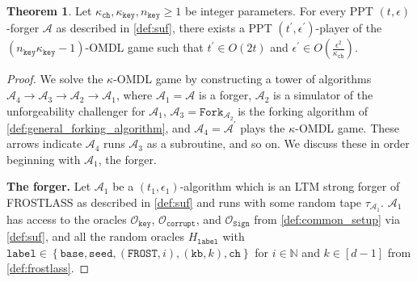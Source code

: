 \documentclass[11pt]{article}
\theoremstyle{definition}
\newtheorem{theorem}{Theorem}[section]
\newcommand{\sign}{\texttt{Sign}}
\newcommand{\corruptionOracle}{\mathcal{O}_{\texttt{corrupt}}}
\newcommand{\signingOracle}{\mathcal{O}_{\sign}}
\newcommand{\keyOracle}{\mathcal{O}_{\texttt{key}}}
\begin{document}
\begin{theorem}\label{thm:suf}
Let $\kappa_{\texttt{ch}}, \kappa_{\texttt{key}}, n_{\texttt{key}} \geq 1$ be integer parameters. For every PPT $(t, \epsilon)$-forger $\mathcal{A}$ as described in \cref{def:suf}, there exists a PPT $(t^\prime, \epsilon^\prime)$-player of the $(n_{\texttt{key}}\kappa_{\texttt{key}} - 1)$-OMDL game such that $t^\prime \in O(2t)$ and $\epsilon^\prime \in O(\frac{\epsilon^2}{\kappa_{\texttt{ch}}})$.
\end{theorem}
\begin{proof}
We solve the $\kappa$-OMDL game by constructing a tower of algorithms $\mathcal{A}_4 \rightarrow \mathcal{A}_3 \rightarrow \mathcal{A}_2 \rightarrow \mathcal{A}_1$, where $\mathcal{A}_1 = \mathcal{A}$ is a forger, $\mathcal{A}_2$ is a simulator of the unforgeability challenger for $\mathcal{A}_1$, $\mathcal{A}_3 = \texttt{Fork}_{\mathcal{A}_2}$ is the forking algorithm of \cref{def:general_forking_algorithm}, and $\mathcal{A}_4 = \mathcal{A}^\prime$ plays the $\kappa$-OMDL game. These arrows indicate $\mathcal{A}_4$ runs $\mathcal{A}_3$ as a subroutine, and so on. We discuss these in order beginning with $\mathcal{A}_1$, the forger.

\textbf{The forger.} Let $\mathcal{A}_1$ be a $(t_1, \epsilon_1)$-algorithm which is an LTM strong forger of FROSTLASS as described in \cref{def:suf} and runs with some random tape $\tau_{\mathcal{A}_1}$. $\mathcal{A}_1$ has access to the oracles $\keyOracle$, $\corruptionOracle$, and $\signingOracle$ from \cref{def:common_setup} via \cref{def:suf}, 
and all the random oracles $H_{\texttt{label}}$ with $\texttt{label} \in \left\{\texttt{base}, \texttt{seed}, (\texttt{FROST}, i), (\texttt{kb}, k), \texttt{ch}\right\}$ for $i \in \mathbb{N}$ and $k \in [d-1]$ from \cref{def:frostlass}. 


\end{proof}
\end{document}

